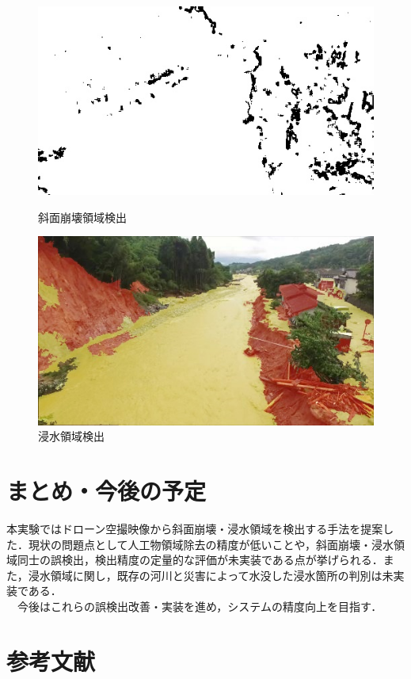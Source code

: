 \documentclass[a4paper, twocolumn, xelatex, 10pt, ja=standard, Ligatures=TeX]{bxjsarticle}
\begin{document}
		\begin{figure}[t]
			\begin{minipage}{0.48\hsize}
				\centering
				\includegraphics[width=\linewidth]{img/maskArtifact.jpg}
				\caption{斜面崩壊領域検出}
				\label{img07}
			\end{minipage}
			\begin{minipage}{0.48\hsize}
				\centering
				\includegraphics[width=\linewidth]{img/result.jpg}
				\caption{浸水領域検出}
				\label{img08}
			\end{minipage}
		\end{figure}

	
	\section{まとめ・今後の予定}
		本実験ではドローン空撮映像から斜面崩壊・浸水領域を検出する手法を提案した．現状の問題点として人工物領域除去の精度が低いことや，斜面崩壊・浸水領域同士の誤検出，検出精度の定量的な評価が未実装である点が挙げられる．また，浸水領域に関し，既存の河川と災害によって水没した浸水箇所の判別は未実装である．\\
		　今後はこれらの誤検出改善・実装を進め，システムの精度向上を目指す．

	\section{参考文献}		

\end{document}
